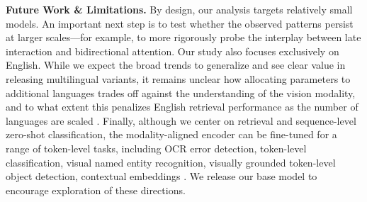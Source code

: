 \noindent\textbf{Future Work \& Limitations.}  
By design, our analysis targets relatively small models. An important next step is to test whether the observed patterns persist at larger scales—for example, to more rigorously probe the interplay between late interaction and bidirectional attention. Our study also focuses exclusively on English. While we expect the broad trends to generalize and see clear value in releasing multilingual variants, it remains unclear how allocating parameters to additional languages trades off against the understanding of the vision modality, and to what extent this penalizes English retrieval performance as the number of languages are scaled \citep{pmlr-v202-fernandes23a}. Finally, although we center on retrieval and sequence-level zero-shot classification, the modality-aligned encoder can be fine-tuned for a range of token-level tasks, including OCR error detection, token-level classification, visual named entity recognition, visually grounded token-level object detection, contextual embeddings \citep{conti2025context}. We release our base model to encourage exploration of these directions. 



